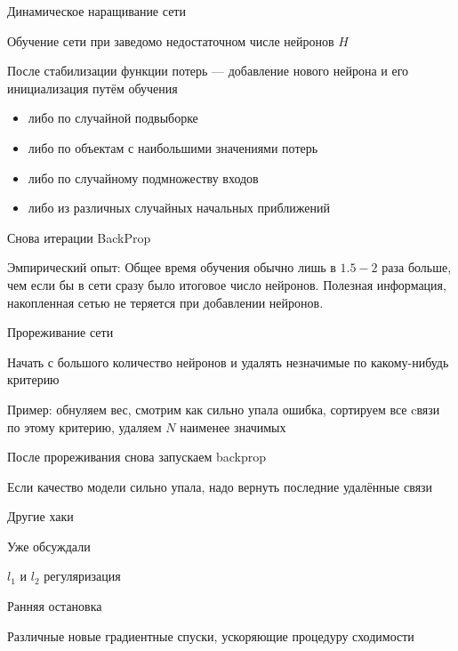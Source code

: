 \documentclass[notes,12pt, aspectratio=169]{beamer}
\newenvironment{transitionframe}{
  \setbeamercolor{background canvas}{bg=yellow}
  \begin{frame}}{
    \end{frame}
}
\newenvironment{wideitemize}{\itemize\addtolength{\itemsep}{10pt}}{\enditemize}
\begin{document}
\begin{frame}{Динамическое наращивание сети}
\begin{wideitemize}
\item  Обучение сети при заведомо недостаточном числе нейронов $H$
\item После стабилизации функции потерь — добавление нового нейрона и его инициализация путём обучения 
\begin{itemize}
	\item либо по случайной подвыборке 
	\item либо по объектам с наибольшими значениями потерь 
	\item либо по случайному подмножеству входов
	\item либо из различных случайных начальных приближений
\end{itemize}
\item Снова итерации BackProp
\end{wideitemize}

\vfill
\begin{center}
\alert{Эмпирический опыт:} Общее время обучения обычно лишь в $1.5-2$ раза больше, чем если бы в сети сразу было итоговое число нейронов. Полезная информация, накопленная сетью не теряется при добавлении нейронов.
\end{center}
\end{frame}


\begin{frame}{Прореживание сети}
\begin{wideitemize}
\item Начать с большого количество нейронов и удалять незначимые по какому-нибудь критерию 
\item \alert{Пример:} обнуляем вес, смотрим как сильно упала ошибка, сортируем все cвязи по этому критерию, удаляем $N$ наименее значимых
\item После прореживания снова запускаем backprop
\item Если качество модели сильно упала, надо вернуть последние удалённые связи 
\end{wideitemize}
\end{frame}


\begin{transitionframe}
	\begin{center}
		\Huge  Другие хаки
	\end{center}
\end{transitionframe}

\begin{frame}{Уже обсуждали}
\begin{wideitemize}
	\item $l_1$ и $l_2$ регуляризация 
	\item Ранняя остановка 
	\item Различные новые градиентные спуски, ускоряющие процедуру сходимости 
\end{wideitemize}
\end{frame}
\end{document}
